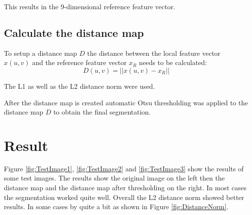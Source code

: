 This results in the 9-dimensional reference feature vector.

\subsection{Calculate the distance map}
To setup a distance map $D$ the distance between the local feature vector $x(u,v)$ and the reference feature vector $x_R$ needs to be calculated:
\begin{equation}
	D(u,v) = ||x(u,v) - x_R||
\end{equation}

The L1 as well as the L2 distance norm were used.

After the distance map is created automatic Otsu thresholding was applied to the distance map $D$ to obtain the final segmentation.

\section{Result}

Figure \ref{fig:TestImage1}, \ref{fig:TestImage2} and \ref{fig:TestImage3} show the results of some test images. The results show the original image on the left then the distance map and the distance map after thresholding on the right. In most cases the segmentation worked quite well.
Overall the L2 distance norm showed better results. In some cases by quite a bit as shown in Figure \ref{fig:DistanceNorm}.

